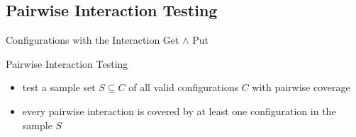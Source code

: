 \subsection{Pairwise Interaction Testing}
\begin{frame}{\myframetitle}
	\begin{mycolumns}
		\begin{example}{Configurations with the Interaction Get $\wedge$ Put}
			\footnotesize
		\end{example}
		\pause
		\begin{definition}{Pairwise Interaction Testing}
			\begin{itemize}
				\setlength\itemsep{.5em}
				\item test a sample set $S \subseteq C$ of all valid configurations $C$ with pairwise coverage
				\item every pairwise interaction is covered by at least one configuration in the sample $S$
			\end{itemize}

\end{definition}
\end{mycolumns}
\end{frame}
